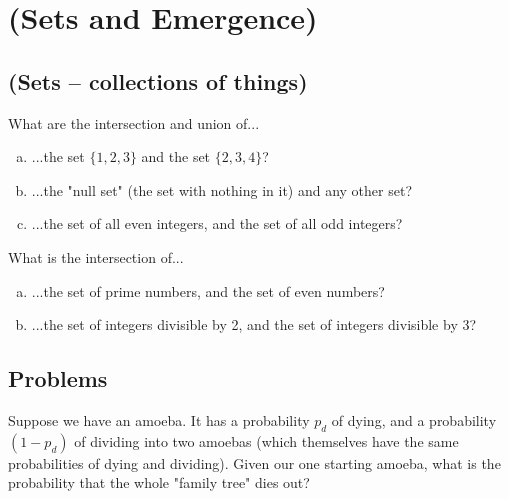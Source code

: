 


\chapter{(Sets and Emergence)}



\section{(Sets -- collections of things)}

\begin{exercise}
What are the intersection and union of...
\begin{enumerate}[(a)]
\item ...the set $\{1, 2, 3\}$ and the set $\{2, 3, 4\}$?
\item ...the "null set" (the set with nothing in it) and any other set?
\item ...the set of all even integers, and the set of all odd integers?
\end{enumerate}
\end{exercise}

\begin{exercise}
What is the intersection of...
\begin{enumerate}[(a)]
\item ...the set of prime numbers, and the set of even numbers?
\item ...the set of integers divisible by 2, and the set of integers divisible by 3?
\end{enumerate}
\end{exercise}


\section{Problems}

\begin{problem}
\label{pr:amoeba-basic}
Suppose we have an amoeba. It has a probability $p_d$ of dying, and a probability $(1 - p_d)$ of dividing into two amoebas (which themselves have the same probabilities of dying and dividing). Given our one starting amoeba, what is the probability that the whole "family tree" dies out?
\end{problem}

